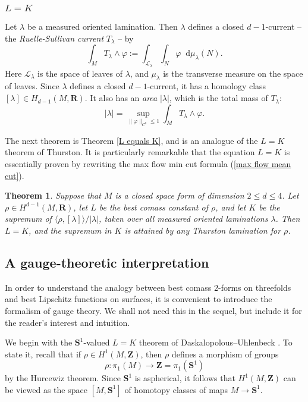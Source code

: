 \documentclass[reqno,11pt]{amsart}
\newcommand{\ZZ}{\mathbf{Z}}
\newcommand{\RR}{\mathbf{R}}
\newcommand{\Sph}{\mathbf S}
\newcommand*\dif{\mathop{}\!\mathrm{d}}
\newcommand{\dfn}[1]{\emph{#1}\index{#1}}
\newtheorem{mainthm}{Theorem}
\theoremstyle{definition}
\numberwithin{equation}{section}
\begin{document}
\subsubsection{\texorpdfstring{$L = K$}{L equals K}}
Let $\lambda$ be a measured oriented lamination.
Then $\lambda$ defines a closed $d-1$-current -- the \dfn{Ruelle-Sullivan current} $T_\lambda$ -- by 
$$\int_M T_\lambda \wedge \varphi := \int_{\mathscr L_\lambda} \int_N \varphi \dif \mu_\lambda(N).$$
Here $\mathscr L_\lambda$ is the space of leaves of $\lambda$, and $\mu_\lambda$ is the transverse measure on the space of leaves.
Since $\lambda$ defines a closed $d-1$-current, it has a homology class $[\lambda] \in H_{d - 1}(M, \RR)$.
It also has an \dfn{area} $|\lambda|$, which is the total mass of $T_\lambda$:
$$|\lambda| = \sup_{\|\varphi\|_{C^0} \leq 1} \int_M T_\lambda \wedge \varphi.$$

The next theorem is Theorem \ref{L equals K}, and is an analogue of the $L = K$ theorem of Thurston.
It is particularly remarkable that the equation $L = K$ is essentially proven by rewriting the max flow min cut formula (\ref{max flow mean cut}).

\begin{mainthm}\label{L is K}
Suppose that $M$ is a closed space form of dimension $2 \leq d \leq 4$.
Let $\rho \in H^{d - 1}(M, \RR)$, let $L$ be the best comass constant of $\rho$, and let $K$ be the supremum of $\langle \rho, [\lambda]\rangle/|\lambda|$, taken over all measured oriented laminations $\lambda$.
Then $L = K$, and the supremum in $K$ is attained by any Thurston lamination for $\rho$.
\end{mainthm}


\subsection{A gauge-theoretic interpretation}
In order to understand the analogy between best comass $2$-forms on threefolds and best Lipschitz functions on surfaces, it is convenient to introduce the formalism of gauge theory.
We shall not need this in the sequel, but include it for the reader's interest and intuition.

We begin with the $\Sph^1$-valued $L = K$ theorem of Daskalopolous--Uhlenbeck \cite[Theorem 5.8]{daskalopoulos2020transverse}.
To state it, recall that if $\rho \in H^1(M, \ZZ)$, then $\rho$ defines a morphism of groups
$$\rho: \pi_1(M) \to \ZZ = \pi_1(\Sph^1)$$
by the Hurcewiz theorem.
Since $\Sph^1$ is aspherical, it follows that $H^1(M, \ZZ)$ can be viewed as the space $[M, \Sph^1]$ of homotopy classes of maps $M \to \Sph^1$.
\end{document}
